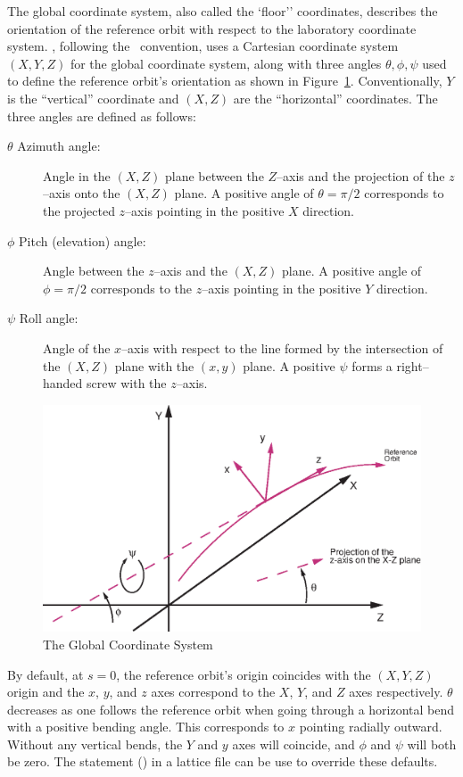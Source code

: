 The global coordinate system, also called the `floor'' coordinates,
describes the orientation of the reference
orbit with respect to the laboratory coordinate system.  \bmad,
following the \mad\ convention, uses a Cartesian coordinate system
$(X, Y, Z)$ for the global coordinate system, along with three angles
$\theta, \phi, \psi$ used to define the reference orbit's orientation
as shown in Figure~\ref{f:global.coords}. Conventionally, $Y$ is the
``vertical'' coordinate and $(X, Z)$ are the ``horizontal'' coordinates.  
The three angles are defined as follows:
\begin{description}
\item[$\theta$ Azimuth angle:] Angle in the $(X, Z)$ plane 
between the $Z$--axis and the projection of the $z$--axis onto the
$(X, Z)$ plane. A positive angle of $\theta = \pi/2$ corresponds to the
projected $z$--axis pointing in the positive $X$ direction.
\item[$\phi$ Pitch (elevation) angle:] Angle between the $z$--axis 
and the $(X,Z)$ plane. A positive angle of $\phi = \pi/2$ corresponds to
the $z$--axis pointing in the positive $Y$ direction.
\item[$\psi$ Roll angle:] Angle of the $x$--axis with respect 
to the line formed by the
intersection of the $(X, Z)$ plane with the $(x, y)$ plane. A
positive $\psi$ forms a right--handed screw with the $z$--axis.
\end{description}

\begin{figure}
\centering
\includegraphics{global-coords.eps}
\caption{The Global Coordinate System}
\label{f:global.coords}
\end{figure}

By default, at $s = 0$, the reference orbit's origin coincides with
the $(X, Y, Z)$ origin and the $x$, $y$, and $z$ axes correspond to
the $X$, $Y$, and $Z$ axes respectively. $\theta$ decreases as one
follows the reference orbit when going through a horizontal bend with
a positive bending angle. This corresponds to $x$ pointing radially
outward. Without any vertical bends, the $Y$ and $y$ axes will
coincide, and $\phi$ and $\psi$ will both be zero. The 
statement () in a lattice file can be use to
override these defaults.

